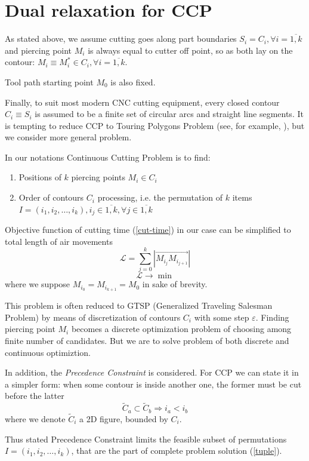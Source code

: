 \documentclass{ifacconf}
\begin{document}
\section{Dual relaxation for CCP}
As stated above,
we assume cutting goes along part boundaries
$S_i = C_i, \forall i=\overline{1, k}$
and piercing point $M_i$ is always equal to
cutter off point,
so as both lay on the contour:
$M_i \equiv M_i^* \in C_i, \forall i = \overline{1, k}$.

Tool path starting point $M_0$ is also fixed.

Finally,
to suit most modern CNC cutting equipment,
every closed contour $C_i \equiv S_i$
is assumed to be
a finite set of circular arcs
and straight line segments.
It is tempting to reduce
CCP to
Touring Polygons Problem
(see, for example, \cite{Qin2017Nov}),
but we consider more general problem.

In our notations Continuous Cutting Problem is to find:
\begin{enumerate}
  \item Positions of $k$ piercing points $M_i \in C_i$
  \item Order of contours $C_i$ processing,
  i.e. the permutation of $k$ items
  $I=(i_1, i_2, \dots, i_k),
    i_j \in \overline{1,k}, \forall j \in \overline{1,k}$
\end{enumerate}
Objective function of cutting time (\ref{cut-time})
in our case can be simplified to total length of air movements
$$
\mathcal L = \sum_{j=0}^k |\overrightarrow{M_{i_j} M_{i_{{j+1}}}}|
$$
$$
\mathcal L \to \min
$$
where we suppose
$M_{i_0} = M_{i_{k+1}} = M_0$
in sake of brevity.

This problem is often
reduced to GTSP
(Generalized Traveling Salesman Problem)
by means of
discretization of contours $C_i$
with some step $\varepsilon$.
Finding piercing point $M_i$
becomes a discrete optimization problem
of choosing among finite number of
candidates.
But we are to solve
problem of both discrete and
continuous optimiztion.

In addition,
the \textit{Precedence Constraint}
is considered.
For CCP we can state it in a simpler form:
when some contour is inside another one,
the former must be cut
before the latter
$$
\tilde C_a \subset \tilde C_b
\Rightarrow
i_a < i_b
$$
where we denote
$\tilde C_i$ a 2D figure,
bounded by $C_i$.

Thus stated Precedence Constraint
limits the feasible subset of permutations
$I=(i_1, i_2, \dots, i_k)$,
that are the part of
complete problem solution (\ref{tuple}).
\end{document}
